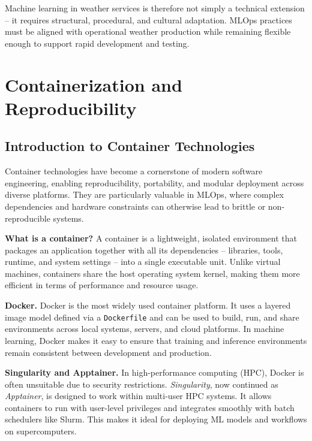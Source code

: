 Machine learning in weather services is therefore not simply a technical extension -- it requires structural, procedural, and cultural adaptation. MLOps practices must be aligned with operational weather production while remaining flexible enough to support rapid development and testing.


%
\section{Containerization and Reproducibility}

%
\subsection{Introduction to Container Technologies}

Container technologies have become a cornerstone of modern software engineering, enabling reproducibility, portability, and modular deployment across diverse platforms. They are particularly valuable in MLOps, where complex dependencies and hardware constraints can otherwise lead to brittle or non-reproducible systems.

{\bf What is a container?} A container is a lightweight, isolated environment that packages an application together with all its dependencies -- libraries, tools, runtime, and system settings -- into a single executable unit. Unlike virtual machines, containers share the host operating system kernel, making them more efficient in terms of performance and resource usage.

{\bf Docker.} Docker is the most widely used container platform. It uses a layered image model defined via a \texttt{Dockerfile} and can be used to build, run, and share environments across local systems, servers, and cloud platforms. In machine learning, Docker makes it easy to ensure that training and inference environments remain consistent between development and production.

{\bf Singularity and Apptainer.} In high-performance computing (HPC), Docker is often unsuitable due to security restrictions. \emph{Singularity}, now continued as \emph{Apptainer}, is designed to work within multi-user HPC systems. It allows containers to run with user-level privileges and integrates smoothly with batch schedulers like Slurm. This makes it ideal for deploying ML models and workflows on supercomputers.

